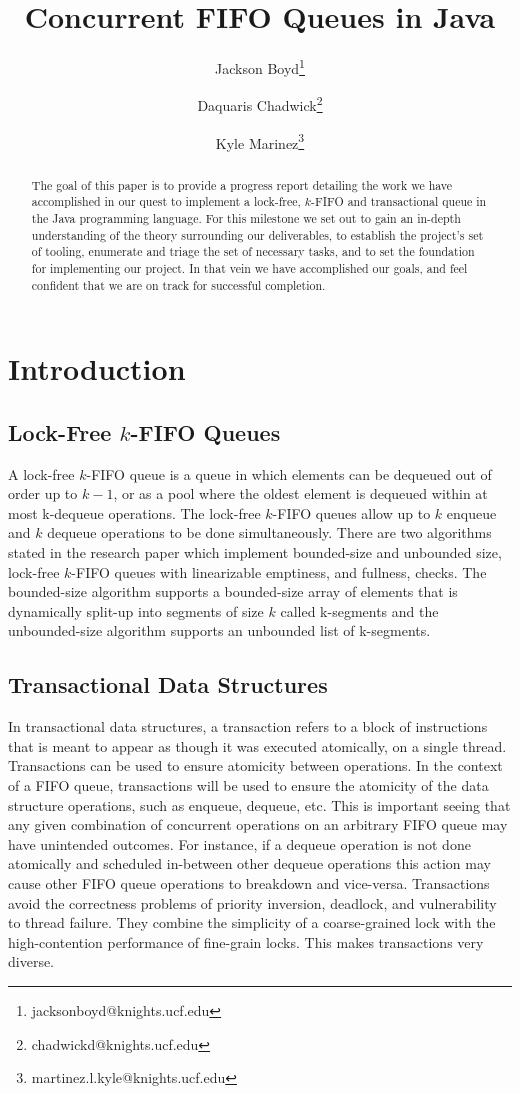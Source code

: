 \documentclass[a4paper, 10pt, conference]{ieeeconf}  %
\title{Concurrent FIFO Queues in Java}
\author{Jackson Boyd\thanks{jacksonboyd@knights.ucf.edu}}
\author{Daquaris Chadwick\thanks{chadwickd@knights.ucf.edu}}
\author{Kyle Marinez\thanks{martinez.l.kyle@knights.ucf.edu}}
\affil{
University of Central Florida \\
\{jacksonboyd, chadwickd, martinez.l.kyle\}@knights.ucf.edu
}
\begin{document}
\maketitle

\begin{abstract}
The goal of this paper is to provide a progress report detailing the work we have accomplished in our quest to implement a lock-free, $k$-FIFO and transactional queue in the Java programming language. For this milestone we set out to gain an in-depth understanding of the theory surrounding our deliverables, to establish the project’s set of tooling, enumerate and triage the set of necessary tasks, and to set the foundation for implementing our project. In that vein we have accomplished our goals, and feel confident that we are on track for successful completion.  
\end{abstract}

\section{Introduction}

\subsection{Lock-Free $k$-FIFO Queues}
A lock-free $k$-FIFO queue is a queue in which elements can be dequeued out of order up to $k-1$, or as a pool where the oldest element is dequeued within at most k-dequeue operations.\cite{2} The lock-free $k$-FIFO queues allow up to $k$ enqueue and $k$ dequeue operations to be done simultaneously. There are two algorithms stated in the research paper which implement bounded-size and unbounded size, lock-free $k$-FIFO queues with linearizable emptiness, and fullness, checks. The bounded-size algorithm supports a bounded-size array of elements that is dynamically split-up into segments of size $k$ called k-segments and the unbounded-size algorithm supports an unbounded list of k-segments.

\subsection{Transactional Data Structures}
In transactional data structures, a transaction refers to a block of instructions that is meant to appear as though it was executed atomically, on a single thread. Transactions can be used to ensure atomicity between operations. In the context of a FIFO queue, transactions will be used to ensure the atomicity of the data structure operations, such as enqueue, dequeue, etc. This is important seeing that any given combination of concurrent operations on an arbitrary FIFO queue may have unintended outcomes. For instance, if a dequeue operation is not done atomically and scheduled in-between other dequeue operations this action may cause other FIFO queue operations to breakdown and vice-versa. Transactions avoid the correctness problems of priority inversion, deadlock, and vulnerability to thread failure. They combine the simplicity of a coarse-grained lock with the high-contention performance of fine-grain locks. This makes transactions very diverse.
\end{document}
